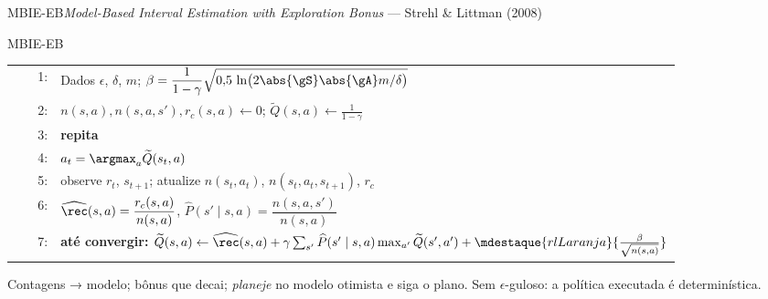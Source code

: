 \documentclass[aspectratio=169, 11pt]{beamer}
\makeatletter
\newcommand{\Qtil}{\widetilde{Q}}
\newcommand{\Rhat}{\widehat{\rec}}
\newcommand{\That}{\widehat{P}}
\newenvironment{pseudo}[1][0.93\linewidth]{%
  \small\setlength{\tabcolsep}{0pt}%
  \begin{tabular}{@{}r@{\hspace{0.55em}}p{#1}@{}}}%
  {\end{tabular}}
\newcommand{\pln}[1]{{\scriptsize\color{rlCinza}#1:}}
\newcommand{\ind}{\hspace*{1.1em}}
\makeatother
\begin{document}
\begin{frame}{MBIE-EB}{\textit{Model-Based Interval Estimation with Exploration Bonus} --- Strehl \& Littman (2008)}
  \vspace{-0.3em}
  \begin{algbox}{MBIE-EB}
    \begin{pseudo}
      \pln{1}  & Dados $\epsilon$, $\delta$, $m$; \quad
                 $\beta = \dfrac{1}{1-\gamma}\sqrt{0{,}5\,\ln\bigl(2\abs{\gS}\abs{\gA}m/\delta\bigr)}$ \\[0.3em]
      \pln{2}  & $n(s,a), n(s,a,s'), r_c(s,a) \gets 0$; \quad
                 $\Qtil(s,a) \gets \tfrac{1}{1-\gamma}$ \\[0.2em]
      \pln{3}  & \textbf{repita} \\
      \pln{4}  & \ind $a_t = \argmax_{a} \Qtil(s_t, a)$ \quad {\scriptsize\color{rlCinza}(guloso na $Q$ \emph{otimista})} \\
      \pln{5}  & \ind observe $r_t$, $s_{t+1}$; atualize $n(s_t,a_t)$, $n(s_t,a_t,s_{t+1})$, $r_c$ \\[0.15em]
      \pln{6}  & \ind $\Rhat(s,a) = \dfrac{r_c(s,a)}{n(s,a)}$, \quad
                 $\That(s'\mid s,a) = \dfrac{n(s,a,s')}{n(s,a)}$ \\[0.35em]
      \pln{7}  & \ind \textbf{até convergir:}\quad
                 $\Qtil(s,a) \gets \Rhat(s,a)
                 + \gamma \sum_{s'} \That(s'\mid s,a)\max_{a'}\Qtil(s',a')
                 + \mdestaque{rlLaranja}{\frac{\beta}{\sqrt{n(s,a)}}}$
    \end{pseudo}
  \end{algbox}
  \vspace{-0.4em}
  {\small\color{rlCinza} Contagens → modelo; bônus que decai; \emph{planeje} no modelo
  otimista e siga o plano. Sem $\epsilon$-guloso: a política executada é determinística.}
\end{frame}
\end{document}
